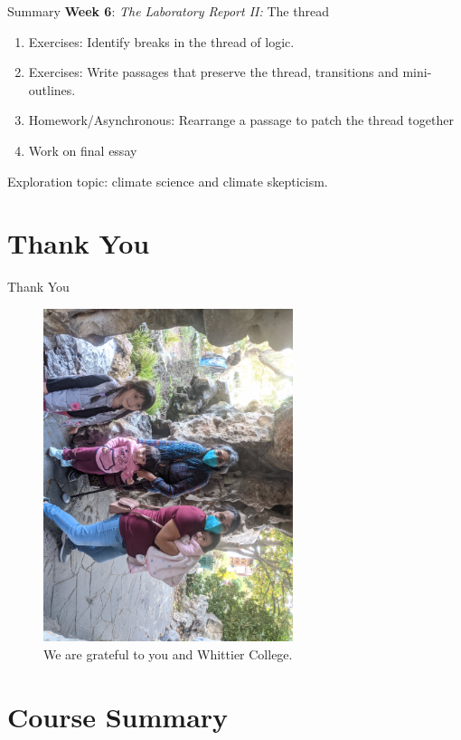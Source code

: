 \documentclass{beamer}
\begin{document}
\begin{frame}{Summary}
\small
\textbf{Week 6}: \textit{The Laboratory Report II:} The thread
\begin{enumerate}
\item Exercises: Identify breaks in the thread of logic.
\item Exercises: Write passages that preserve the thread, transitions and mini-outlines.
\item Homework/Asynchronous: Rearrange a passage to patch the thread together
\item Work on final essay
\end{enumerate}
Exploration topic: climate science and climate skepticism.
\end{frame}

\section{Thank You}

\begin{frame}{Thank You}
\begin{figure}
\centering
\includegraphics[width=0.65\textwidth,angle=90]{figures/fam4.jpg}
\caption{\label{fig:fams} We are grateful to you and Whittier College.}
\end{figure}
\end{frame}

\section{Course Summary}
\end{document}
